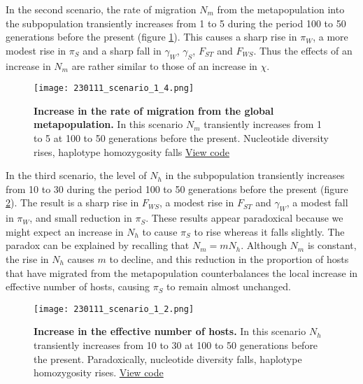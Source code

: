 \documentclass[_main.tex]{subfiles}
\begin{document}
In the second scenario, the rate of migration $N_m$ from the metapopulation into the subpopulation transiently increases from 1 to 5 during the period 100 to 50 generations before the present (figure \ref{fig:scenario_1}).   This causes a sharp rise in $\pi_W$, a more modest rise in $\pi_S$ and a sharp fall in $\gamma_W$, $\gamma_S$, $F_{ST}$ and $F_{WS}$.   Thus the effects of an increase in $N_m$ are rather similar to those of an increase in $\chi$.

\begin{figure}[h!]
\centering
\texttt{[image: 230111\_scenario\_1\_4.png]}
\caption{\textbf{Increase in the rate of migration from the global metapopulation.}  In this scenario $N_m$ transiently increases from 1 to 5 at 100 to 50 generations before the present.  Nucleotide diversity rises, haplotype homozygosity falls
\href{https://github.com/d-kwiat/gtg/blob/main/scenario_1.ipynb}{View code}
}
\label{fig:scenario_1}
\end{figure}

In the third scenario, the level of $N_h$ in the subpopulation transiently increases from 10 to 30 during the period 100 to 50 generations before the present (figure \ref{fig:scenario_1_2}).   The result is a sharp rise in $F_{WS}$, a modest rise in $F_{ST}$ and $\gamma_W$, a modest fall in $\pi_W$, and small reduction in $\pi_S$.  These results appear paradoxical because we might expect an increase in $N_h$ to cause $\pi_S$ to rise whereas it falls slightly.  The paradox can be explained by recalling that $N_m = m N_h$.  Although $N_m$ is constant, the rise in $N_h$ causes $m$ to decline, and this reduction in the proportion of hosts that have migrated from the metapopulation counterbalances the local increase in effective number of hosts, causing $\pi_S$ to remain almost unchanged.

\begin{figure}[h!]
\centering
\texttt{[image: 230111\_scenario\_1\_2.png]}
\caption{\textbf{Increase in the effective number of hosts.}  In this scenario $N_h$ transiently increases from 10 to 30 at 100 to 50 generations before the present.   Paradoxically, nucleotide diversity falls, haplotype homozygosity rises.
\href{https://github.com/d-kwiat/gtg/blob/main/scenario_1.ipynb}{View code}
}
\label{fig:scenario_1_2}
\end{figure}
\end{document}
